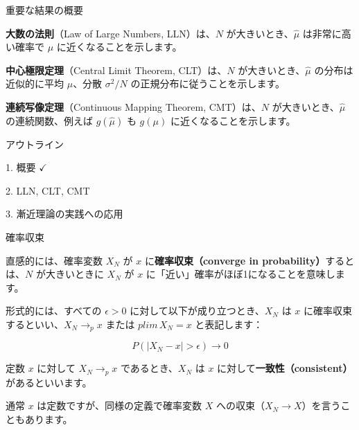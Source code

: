\documentclass[11pt,handout]{beamer}
\newenvironment{wideitemize}{\itemize\addtolength{\itemsep}{10pt}}{\enditemize}
\begin{document}
\begin{frame}{重要な結果の概要}
	
\begin{wideitemize}

\item \textbf{大数の法則}（Law of Large Numbers, LLN）は、$N$ が大きいとき、$\hat\mu$ は非常に高い確率で $\mu$ に近くなることを示します。

\pause
\item \textbf{中心極限定理}（Central Limit Theorem, CLT）は、$N$ が大きいとき、$\hat\mu$ の分布は近似的に平均 $\mu$、分散 $\sigma^2/N$ の正規分布に従うことを示します。

\pause
\item \textbf{連続写像定理}（Continuous Mapping Theorem, CMT）は、$N$ が大きいとき、$\hat\mu$ の連続関数、例えば $g(\hat\mu)$ も $g(\mu)$ に近くなることを示します。

\end{wideitemize}	
\end{frame}

\begin{frame}{アウトライン}

\textcolor{red!75!green!50!blue!25!gray}{1. 概要} $\checkmark$
\vspace{0.8cm}

2. LLN, CLT, CMT
\vspace{0.8cm}

\textcolor{red!75!green!50!blue!25!gray}{3. 漸近理論の実践への応用}

\end{frame}

\begin{frame}{確率収束}
	
\begin{wideitemize}
\item
直感的には、確率変数 $X_N$ が $x$ に\textbf{確率収束（converge in probability）}するとは、$N$ が大きいときに $X_N$ が $x$ に「近い」確率がほぼ1になることを意味します。

\pause
\item
形式的には、すべての $\epsilon > 0$ に対して以下が成り立つとき、$X_N$ は $x$ に確率収束するといい、$X_N \rightarrow_p x$ または $plim \, X_N =x $ と表記します：

$$P(|X_N - x| > \epsilon) \rightarrow 0 $$

\pause
\item 
定数 $x$ に対して $X_N \rightarrow_p x$ であるとき、$X_N$ は $x$ に対して\textbf{一致性（consistent）}があるといいます。

\pause
\item
通常 $x$ は定数ですが、同様の定義で確率変数 $X$ への収束（$X_N \rightarrow X$）を言うこともあります。
	
\end{wideitemize}

\end{frame}
\end{document}

